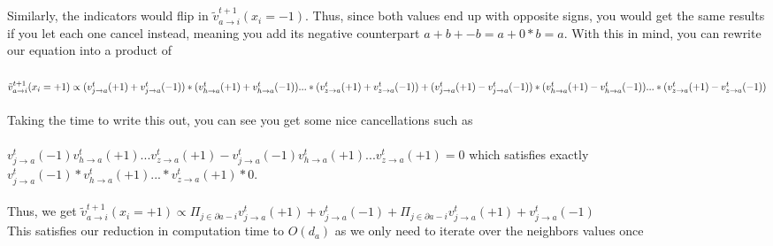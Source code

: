 \documentclass[12pt]{article}
\begin{document}
\begin{section}{5.1}
	\\
	\\
	Similarly, the indicators would flip in 	$\tilde{v}_{a \rightarrow i}^{t+1} (x_i = -1)$. Thus, since both values end up with opposite signs, you would get the same results if you let each one cancel instead, meaning you add its negative counterpart $a+b + -b = a +0*b = a$. With this in mind, you can rewrite our equation into a product of \\
	\\
	$\tilde{v}_{a \rightarrow i}^{t+1} (x_i = +1) \propto (v_{j \rightarrow a}^{t}(+1)+v_{j \rightarrow a}^{t}(-1))\\ *(v_{h \rightarrow a}^{t}(+1)+v_{h \rightarrow a}^{t}(-1)) ... \\ * (v_{z \rightarrow a}^{t}(+1)+v_{z \rightarrow a}^{t}(-1)) \\
	+
	\\
	(v_{j \rightarrow a}^{t}(+1)-v_{j \rightarrow a}^{t}(-1))\\ *(v_{h \rightarrow a}^{t}(+1)-v_{h \rightarrow a}^{t}(-1)) ... \\ * (v_{z \rightarrow a}^{t}(+1)-v_{z \rightarrow a}^{t}(-1))
	$
	\\
	\\
	Taking the time to write this out, you can see you get some nice cancellations such as \\ \\
	$v_{j \rightarrow a}^{t}(-1)v_{h \rightarrow a}^{t}(+1)...v_{z \rightarrow a}^{t}(+1) - v_{j \rightarrow a}^{t}(-1)v_{h \rightarrow a}^{t}(+1)...v_{z \rightarrow a}^{t}(+1) = 0$ which satisfies exactly  $v_{j \rightarrow a}^{t}(-1)*v_{h \rightarrow a}^{t}(+1) ... * v_{z \rightarrow a}^{t}(+1)*0$. 
	\\
	\\
	Thus, we get $\tilde{v}_{a \rightarrow i}^{t+1} (x_i = +1) \propto  \Pi_{j\in\partial a - i}v_{j \rightarrow a}^{t}(+1)+v_{j \rightarrow a}^{t}(-1) + \Pi_{j\in\partial a - i}v_{j \rightarrow a}^{t}(+1)+v_{j \rightarrow a}^{t}(-1) $
	\\
	This satisfies our reduction in computation time to $O(d_a)$ as we only need to iterate over the neighbors values once

\end{section}
\end{document}
